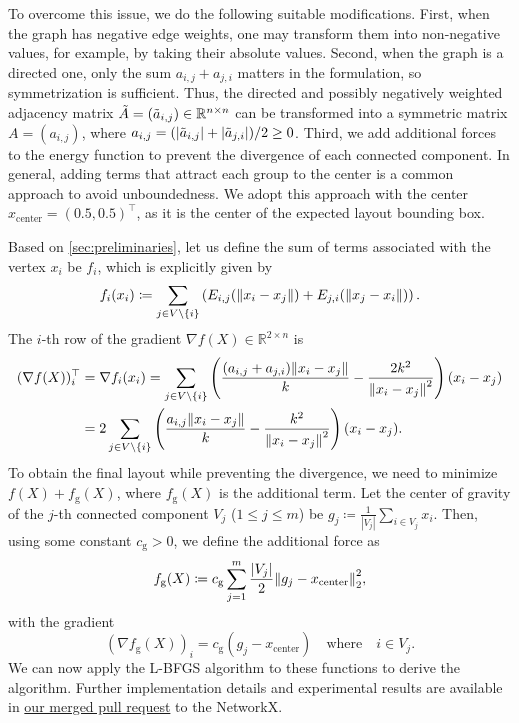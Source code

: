 \documentclass[11pt]{article}
\begin{document}
To overcome this issue, we do the following suitable modifications. First, when the graph has negative edge weights, one may transform them into non-negative values, for example, by taking their absolute values. Second, when the graph is a directed one, only the sum $a_{i, j}+ a_{j, i}$ matters in the formulation, so symmetrization is sufficient. Thus, the directed and possibly negatively weighted adjacency matrix $\Tilde{A}= (\Tilde{a}_{i,j}) \in \mathbb{R}^{n \times n}$ can be transformed into a symmetric matrix $A = (a_{i,j})$, where $a_{i,j}= (\lvert \Tilde{a}_{i,j}\rvert + \lvert \Tilde{a}_{j,i}\rvert)/2 \geq 0$. Third, we add additional forces to the energy function to prevent the divergence of each connected component. In general, adding terms that attract each group to the center is a common approach to avoid unboundedness. We adopt
this approach with the center $x_{\mathrm{center}}=(0.5, 0.5)^{\top}$, as it
is the center of the expected layout bounding box.

Based on \cref{sec:preliminaries}, let us define the sum of terms associated with the vertex $x_{i}$ be $f_{i}$, which
is explicitly given by
\begin{equation*}
  f_{i}(x_{i}) \coloneqq \sum_{j \in V \setminus \{i\}}\left( E_{i,j}(\norm{x_{i}- x_{j}}
  ) + E_{j,i}(\norm{x_{j}- x_{i}}) \right).
\end{equation*}
The $i$-th row of the gradient $\nabla f(X) \in \mathbb{R}^{2 \times n}$ is
\begin{align*}
  (\nabla f(X))_{i}^{\top} & = \nabla f_{i}(x_{i}) = \sum_{j \in V \setminus \{i\}}\left(\frac{(a_{i,j}+a_{j,i})\norm{ x_{i}- x_{j}}}{k}- \frac{2k^{2}}{\norm{ x_{i}- x_{j}}^{2}}\right) (x_{i}- x_{j}) \\
                           & = 2 \sum_{j \in V \setminus \{i\}}\left(\frac{a_{i,j}\norm{ x_{i}- x_{j}}}{k}- \frac{k^{2}}{\norm{ x_{i}- x_{j}}^{2}}\right) (x_{i}- x_{j}).
\end{align*}
To obtain the final layout while preventing the divergence, we need to
minimize $f(X) + f_{\mathrm{g}}(X)$, where $f_{\mathrm{g}}(X)$ is the additional
term. Let the center of gravity of the $j$-th connected component $V_{j}$ ($1 \leq
  j \leq m$) be $g_{j}\coloneqq \frac{1}{|V_{j}|}\sum_{i \in V_j}x_{i}$. Then,
using some constant $c_{\mathrm{g}}>0$, we define the additional force as
\begin{equation*}
  f_{\mathrm{g}}(X) \coloneqq c_{\mathrm{g}}\sum_{j=1}^{m}\frac{\lvert V_{j}\rvert}{2}
  \norm{ g_{j} - x_{\mathrm{center}}}_{2}^{2},
\end{equation*}
with the gradient
\begin{equation*}
  (\nabla f_{\mathrm{g}}(X))_{i}= c_{\mathrm{g}}(g_{j}- x_{\mathrm{center}}) \quad
  \text{where}\quad i \in V_{j}.
\end{equation*}
We can now apply the L-BFGS algorithm to these functions to derive the algorithm.
Further implementation details and experimental results are available in
\href{https://github.com/networkx/networkx/pull/7889}{our merged pull request}
to the NetworkX.
\end{document}
